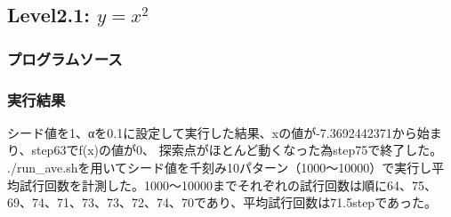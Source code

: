 \subsection{Level2.1: $y=x^2$}
\subsubsection{プログラムソース}


\subsubsection{実行結果}

シード値を1、αを0.1に設定して実行した結果、xの値が-7.3692442371から始まり、step63でf(x)の値が0、
探索点がほとんど動くなった為step75で終了した。\\
./run\_ave.shを用いてシード値を千刻み10パターン（1000〜10000）で実行し平均試行回数を計測した。1000〜10000までそれぞれの試行回数は順に64、75、69、74、71、73、73、72、74、70であり、平均試行回数は71.5stepであった。
\newline
